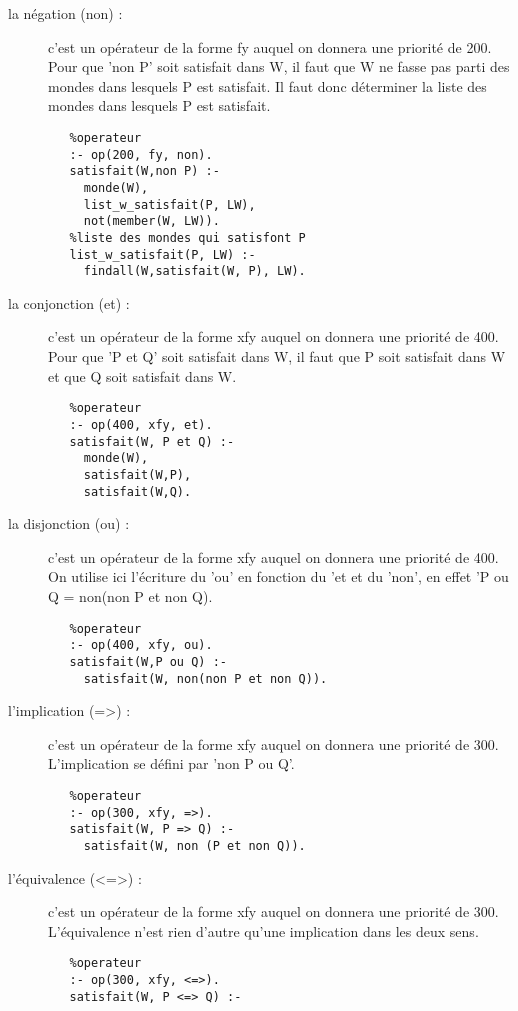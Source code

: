 \documentclass[a4paper,10pt]{article}
\begin{document}
   \begin{description}
    \item[la n\'{e}gation (non) :] c'est un op\'{e}rateur de la forme fy auquel on donnera une priorit\'{e} de 200. Pour que 'non P' soit satisfait dans W,
    il faut que W ne fasse pas parti des mondes dans lesquels P est satisfait. Il faut donc d\'{e}terminer la liste des mondes dans lesquels P est satisfait.
       \begin{lstlisting}
   %operateur
   :- op(200, fy, non).
   satisfait(W,non P) :-
     monde(W),
     list_w_satisfait(P, LW), 
     not(member(W, LW)).
   %liste des mondes qui satisfont P
   list_w_satisfait(P, LW) :-
     findall(W,satisfait(W, P), LW).
       \end{lstlisting}
    \item[la conjonction (et) :] c'est un op\'{e}rateur de la forme xfy auquel on donnera une priorit\'{e} de 400. Pour que 'P et Q' soit satisfait dans W,
    il faut que P soit satisfait dans W et que Q soit satisfait dans W.
       \begin{lstlisting}
   %operateur
   :- op(400, xfy, et).
   satisfait(W, P et Q) :-
     monde(W),
     satisfait(W,P),
     satisfait(W,Q).
       \end{lstlisting}
    \item[la disjonction (ou) :] c'est un op\'{e}rateur de la forme xfy auquel on donnera une priorit\'{e} de 400. On utilise ici l'\'{e}criture du 'ou'
    en fonction du 'et et du 'non', en effet 'P ou Q = non(non P et non Q).
       \begin{lstlisting}
   %operateur
   :- op(400, xfy, ou).
   satisfait(W,P ou Q) :-
     satisfait(W, non(non P et non Q)).
       \end{lstlisting}
    \item[l'implication (=>) :] c'est un op\'{e}rateur de la forme xfy auquel on donnera une priorit\'{e} de 300. L'implication se d\'{e}fini par 'non P ou Q'.
       \begin{lstlisting}
   %operateur
   :- op(300, xfy, =>).
   satisfait(W, P => Q) :-
     satisfait(W, non (P et non Q)).
       \end{lstlisting}
    \item[l'\'{e}quivalence (<=>) :] c'est un op\'{e}rateur de la forme xfy auquel on donnera une priorit\'{e} de 300. L'\'{e}quivalence n'est rien d'autre qu'une implication dans
    les deux sens.
       \begin{lstlisting}
   %operateur
   :- op(300, xfy, <=>).
   satisfait(W, P <=> Q) :-

\end{lstlisting}
\end{description}
\end{document}
